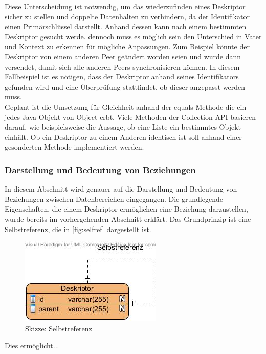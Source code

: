 \documentclass[a4paper]{article}
\begin{document}
	Diese Unterscheidung ist notwendig, um das wiederzufinden eines Deskriptor
	sicher zu stellen und doppelte Datenhalten zu verhindern, da der Identifikator
	einen Primärschlüssel darstellt. Anhand dessen kann nach einem bestimmten
	Deskriptor gesucht werde. dennoch muss es möglich sein den Unterschied in
	Vater und Kontext zu erkennen für mögliche Anpassungen. Zum Beispiel könnte
	der Deskriptor von einem anderen Peer geändert worden seien und wurde dann
	versendet, damit sich alle anderen Peers synchronisieren können. In diesem
	Fallbeispiel ist es nötigen, dass der Deskriptor anhand seines Identifikators
	gefunden wird und eine Überprüfung stattfindet, ob dieser angepasst werden
	muss. \\
	
	Geplant ist die Umsetzung für Gleichheit anhand der equals-Methode die ein
	jedes Java-Objekt von Object erbt. Viele Methoden der Collection-API basieren
	darauf, wie beispielsweise die Aussage, ob eine Liste ein bestimmtes Objekt
	einhält. Ob ein Deskriptor zu einem Anderen identisch ist soll anhand einer
	gesonderten Methode implementiert werden.
	
	\subsubsection{Darstellung und Bedeutung von Beziehungen}
	
	In diesem Abschnitt wird genauer auf die Darstellung und Bedeutung von 
	Beziehungen zwischen Datenbereichen eingegangen. Die grundlegende
	Eigenschaften, die einem Deskriptor ermöglichen eine Beziehung darzustellen,
	wurde bereits im vorhergehenden Abschnitt erklärt. Das Grundprinzip ist eine
	Selbstreferenz, die in \autoref{fig:selfref} dargestellt ist.
	
	\begin{figure}[H] 
		\centerline{
			\includegraphics[scale=0.8]{../Bilder/selfref.jpg}
		}
		\caption{Skizze: Selbstreferenz}
		\label{fig:selfref}
	\end{figure}
	
	Dies ermöglicht...
	
\end{document}
